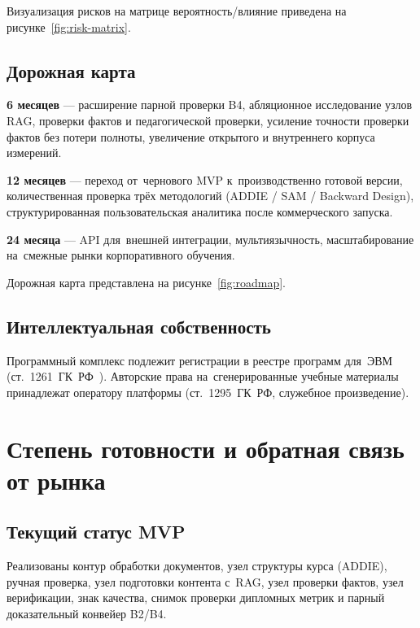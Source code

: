 Визуализация рисков на матрице вероятность/влияние приведена на рисунке~\ref{fig:risk-matrix}.



\subsection{Дорожная карта}

\textbf{6 месяцев} — расширение парной проверки B4, абляционное исследование
узлов RAG, проверки фактов и педагогической проверки, усиление точности проверки фактов без потери полноты,
увеличение открытого и внутреннего корпуса измерений.

\textbf{12 месяцев} — переход от~чернового MVP к~производственно готовой
версии, количественная проверка трёх методологий
(ADDIE / SAM / Backward Design), структурированная пользовательская
аналитика после коммерческого запуска.

\textbf{24 месяца} — API для~внешней интеграции, мультиязычность,
масштабирование на~смежные рынки корпоративного обучения.

Дорожная карта представлена на рисунке~\ref{fig:roadmap}.



\subsection{Интеллектуальная собственность}

Программный комплекс подлежит регистрации в реестре программ
для~ЭВМ (ст.~1261~ГК~РФ~\cite{gk_rf_part4}).
Авторские права на~сгенерированные учебные материалы принадлежат
оператору платформы (ст.~1295~ГК~РФ, служебное произведение).

\section{Степень готовности и обратная связь от рынка}

\subsection{Текущий статус MVP}

Реализованы контур обработки документов, узел структуры курса (ADDIE),
ручная проверка, узел подготовки контента с~RAG, узел проверки фактов,
узел верификации,
знак качества, снимок проверки дипломных метрик и парный доказательный конвейер B2/B4.

